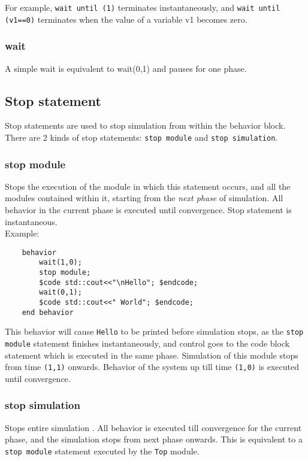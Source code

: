 	For example, \texttt{wait until (1)} terminates instantaneously, and \texttt{wait until (v1==0)}
	terminates when the value of a variable v1 becomes zero.



	\subsubsection{wait}
	A simple wait is equivalent to wait(0,1) and pauses for one phase.

	
	
	
	
	\subsection{Stop statement}
	Stop statements are used to stop simulation from within the
	behavior block. There are 2 kinds of stop statements: 
	\texttt{stop module} and \texttt{stop simulation}.

	\subsubsection{stop module}
	Stops the execution of the module in which
	this statement occurs, and all the modules contained within it,
	starting from the \emph{next phase} of simulation. All behavior in the
	current phase is executed until convergence.
	Stop statement is instantaneous.\\
	Example:
	\begin{verbatim}
	behavior 
		wait(1,0);
		stop module;
		$code std::cout<<"\nHello"; $endcode;
		wait(0,1);
		$code std::cout<<" World"; $endcode;
	end behavior
	\end{verbatim}
	This behavior will cause \texttt{Hello} to be printed before simulation
	stops, as the \texttt{stop module} statement finishes instantaneously,
	and control goes to the code block statement which is executed in the
	same phase.  Simulation of this module stops from time \texttt{(1,1)}
	onwards.  Behavior of the system up till time \texttt{(1,0)} is
	executed until convergence.
	
	
	\subsubsection{stop simulation}
	Stops entire simulation . All behavior
	is executed till convergence for the current phase, and the 
	simulation stops from next phase onwards. This is equivalent to  
	a \texttt{stop module} statement executed by the \texttt{Top} module.

